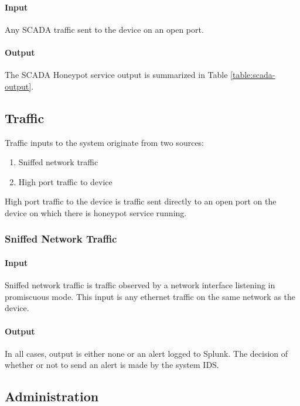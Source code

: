 \paragraph{Input}

Any SCADA traffic sent to the device on an open port.

\paragraph{Output}

The SCADA Honeypot service output is summarized in Table
\ref{table:scada-output}.


\subsection{Traffic}

Traffic inputs to the system originate from two sources:

\begin{enumerate}
    \item Sniffed network traffic
    \item High port traffic to device
\end{enumerate}

High port traffic to the device is traffic sent directly to an open port
on the device on which there is honeypot service running.

\subsubsection{Sniffed Network Traffic}

\paragraph{Input}

Sniffed network traffic is traffic observed by a network interface listening
in promiscuous mode. This input is any ethernet traffic on the same network
as the device.

\paragraph{Output}

In all cases, output is either none or an alert logged to Splunk. The decision
of whether or not to send an alert is made by the system IDS.

\subsection{Administration}

